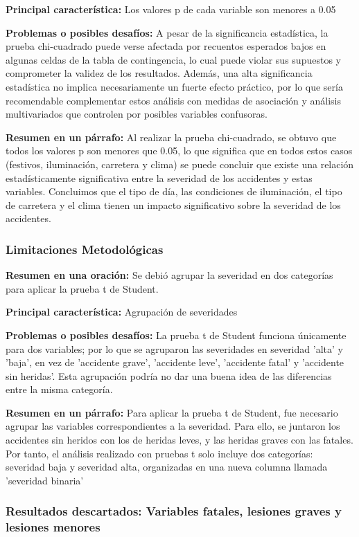 \documentclass{book}
\begin{document}
\textbf{Principal característica:} Los valores p de cada variable son menores a 0.05

\textbf{Problemas o posibles desafíos:} A pesar de la significancia estadística, la prueba chi-cuadrado puede verse afectada por recuentos esperados bajos en algunas celdas de la tabla de contingencia, lo cual puede violar sus supuestos y comprometer la validez de los resultados. Además, una alta significancia estadística no implica necesariamente un fuerte efecto práctico, por lo que sería recomendable complementar estos análisis con medidas de asociación y análisis multivariados que controlen por posibles variables confusoras.

\textbf{Resumen en un párrafo:} Al realizar la prueba chi-cuadrado, se obtuvo que todos los valores p son menores que 0.05, lo que significa que en todos estos casos (festivos, iluminación, carretera y clima) se puede concluir que existe una relación estadísticamente significativa entre la severidad de los accidentes y estas variables. Concluimos que el tipo de día, las condiciones de iluminación, el tipo de carretera y el clima tienen un impacto significativo sobre la severidad de los accidentes.


\subsubsection{Limitaciones Metodológicas}
\textbf{Resumen en una oración:} Se debió agrupar la severidad en dos categorías para aplicar la prueba t de Student.

\textbf{Principal característica:} Agrupación de severidades

\textbf{Problemas o posibles desafíos:} La prueba t de Student funciona únicamente para dos variables; por lo que se agruparon las severidades en severidad 'alta' y 'baja', en vez de 'accidente grave', 'accidente leve', 'accidente fatal' y 'accidente sin heridas'. Esta agrupación podría no dar una buena idea de las diferencias entre la misma categoría.

\textbf{Resumen en un párrafo:} Para aplicar la prueba t de Student, fue necesario agrupar las variables correspondientes a la severidad. Para ello, se juntaron los accidentes sin heridos con los de heridas leves, y las heridas graves con las fatales. Por tanto, el análisis realizado con pruebas t solo incluye dos categorías: severidad baja y severidad alta, organizadas en una nueva columna llamada 'severidad binaria'


\subsubsection{Resultados descartados: Variables fatales, lesiones graves y lesiones menores}
\end{document}
